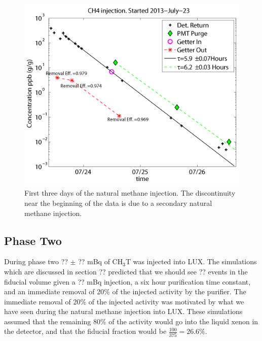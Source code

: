 \begin{figure}[H]
\centering
\includegraphics[scale=0.3]{CH4_injection.png}
\caption{First three days of the natural methane injection.  The discontinuity near the beginning of the data is due to a secondary natural methane injection.}
\label{fig:CH4Inject}
\end{figure}

\subsection{Phase Two}

During phase two ?? $\pm$ ?? mBq of CH$_3$T was injected into LUX.  The simulations which are discussed in section ?? predicted that we should see ?? events in the fiducial volume given a ?? mBq injection, a six hour purification time constant, and an immediate removal of 20\% of the injected activity by the purifier.  The immediate removal of 20\% of the injected activity was motivated by what we have seen during the natural methane injection into LUX.  These simulations assumed that the remaining 80\% of the activity would go into the liquid xenon in the detector, and that the fiducial fraction would be $\frac{100}{375}=26.6\%$.


